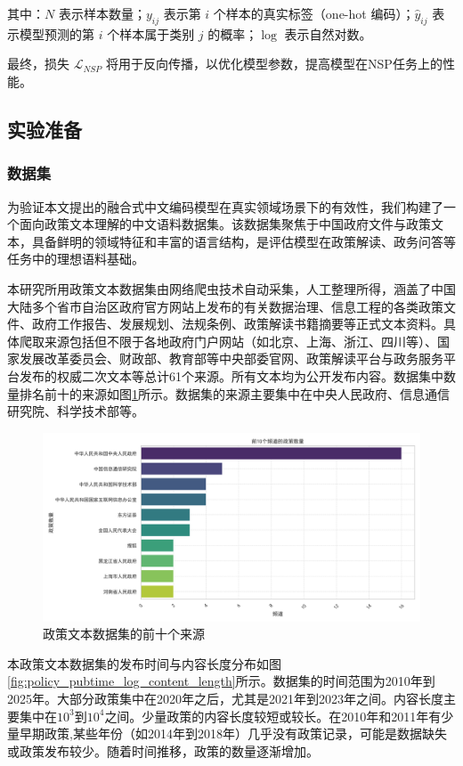 \documentclass[12pt, a4paper]{ctexart}
\begin{document}
其中：$N$ 表示样本数量；$y_{ij}$ 表示第 $i$ 个样本的真实标签（one-hot 编码）；$\hat{y}_{ij}$ 表示模型预测的第 $i$ 个样本属于类别 $j$ 的概率；$\log$ 表示自然对数。


最终，损失 $\mathcal{L}_{NSP}$ 将用于反向传播，以优化模型参数，提高模型在NSP任务上的性能。
\subsection{实验准备}
\subsubsection{数据集}
为验证本文提出的融合式中文编码模型在真实领域场景下的有效性，我们构建了一个面向政策文本理解的中文语料数据集。该数据集聚焦于中国政府文件与政策文本，具备鲜明的领域特征和丰富的语言结构，是评估模型在政策解读、政务问答等任务中的理想语料基础。

本研究所用政策文本数据集由网络爬虫技术自动采集，人工整理所得，涵盖了中国大陆多个省市自治区政府官方网站上发布的有关数据治理、信息工程的各类政策文件、政府工作报告、发展规划、法规条例、政策解读书籍摘要等正式文本资料。具体爬取来源包括但不限于各地政府门户网站（如北京、上海、浙江、四川等）、国家发展改革委员会、财政部、教育部等中央部委官网、政策解读平台与政务服务平台发布的权威二次文本等总计61个来源。所有文本均为公开发布内容。数据集中数量排名前十的来源如图\ref{fig:top_10_channels_policy_count}所示。数据集的来源主要集中在中央人民政府、信息通信研究院、科学技术部等。

\begin{figure}
    \centering
    \includegraphics[width=1\textwidth]{images/top_10_channels_policy_count.png}
    \caption{政策文本数据集的前十个来源}
    \label{fig:top_10_channels_policy_count}
\end{figure}

本政策文本数据集的发布时间与内容长度分布如图\ref{fig:policy_pubtime_log_content_length}所示。数据集的时间范围为2010年到2025年。大部分政策集中在2020年之后，尤其是2021年到2023年之间。内容长度主要集中在$10^3$到$10^4$之间。少量政策的内容长度较短或较长。在2010年和2011年有少量早期政策,某些年份（如2014年到2018年）几乎没有政策记录，可能是数据缺失或政策发布较少。随着时间推移，政策的数量逐渐增加。
\end{document}
